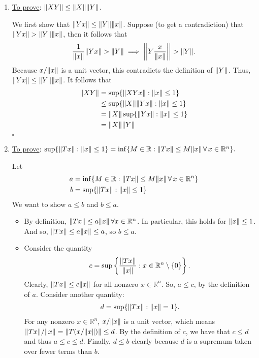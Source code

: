\documentclass[11pt]{article}
\begin{document}
\begin{enumerate}
	\item \underline{To prove}: $\norm{X Y} \leq \norm{X}\norm{Y}$. 

	We first show that $\norm{Yx} \leq \norm{Y} \norm{x}$. Suppose (to get a contradiction) that $\norm{Yx} > \norm{Y} \norm{x}$, then it follows that
	\begin{align*}
	\frac{1}{\norm{x}} \norm{Y x } > \norm{ Y } \implies \bigg\vert\bigg\vert Y \frac{x}{\norm{x}} \bigg\vert\bigg\vert  > \norm{ Y }.
	\end{align*}
	Because $x/\norm{x}$ is a unit vector, this contradicts the definition of $\norm{Y }$. Thus, $\norm{ Yx} \leq \norm{ Y } \norm{ x}$. It follows that
	\begin{align*}
	\norm{ XY } &= \sup  \{ \norm{ XY x } :\norm{x} \leq 1\}\nonumber\\
	&\leq \sup  \{ \norm{ X } \norm{ Y x } :\norm{x} \leq 1\}\nonumber\\
	&= \norm{ X } \sup  \{ \norm{ Y x } : \norm{x} \leq 1\}\nonumber\\
	&= \norm{ X } \norm{ Y } 
	\end{align*}
	\hfill $\square$
	
	
	
	
	
	\item  \underline{To prove}: $\sup  \{ \norm{ T x } :\norm{x} \leq 1\} = \inf  \{ M \in \mathbb{R} : \norm{ Tx } \leq M \norm{ x  } \,\forall\, x \in \mathbb{R}^n \}.$
	
	
	Let 
	\begin{align*}
	a &=  \inf  \{ M \in \mathbb{R} : \norm{ Tx } \leq M \norm{ x  } \,\forall\, x \in \mathbb{R}^n \}\nonumber\\
	b &=  \sup  \{ \norm{ T x } : \norm{x} \leq 1\}
	\end{align*}
	We want to show $a\leq b$ and $b \leq a$.
	\begin{itemize}
		\item By definition, $\norm{ Tx } \leq a \norm{x}\, \forall x \in \mathbb{R}^n$. In particular, this holds for $\norm{x} \leq 1$. And so, $\norm{ T x } \leq a \norm{x} \leq a $, so  $b \leq a$.  
		\item Consider the quantity
		\begin{align*}
		c = \sup \left\{\frac{\norm{ Tx }}{ \norm{x}}: x \in \mathbb{R}^n \setminus\{ 0\} \right\}.
		\end{align*} 
		Clearly, $\norm{ T x } \leq c\norm{x}$ for all nonzero $x \in \mathbb{R}^n$. So, $a \leq c$, by the definition of $a$. Consider another quantity:
		\begin{align*}
		d = \sup \{\norm{Tx}:\norm{x} = 1\}.
		\end{align*}
		For any nonzero $x\in \mathbb{R}^n$, $x/\norm{x}$ is a unit vector, which means $\norm{Tx}/\norm{x} = \norm{T(x/\norm{x})}  \leq d$. By the definition of $c$, we have that $c \leq d$ and thus $a \leq c \leq d$. Finally, $d \leq b$ clearly because $d$ is a supremum taken over fewer terms than $b$. 
		

\end{itemize}
\end{enumerate}
\end{document}
